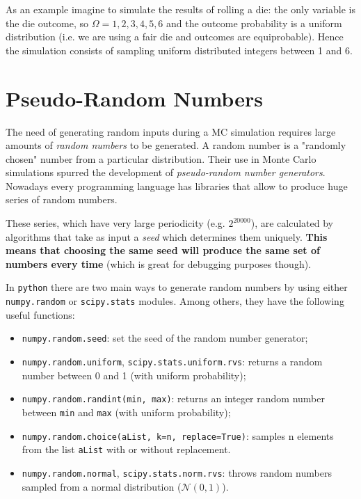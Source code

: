 As an example imagine to simulate the results of rolling a die: the only variable is the die outcome, so $\Omega =1,2,3,4,5,6$ and the outcome probability is a uniform distribution (i.e. we are using a fair die and outcomes are equiprobable). Hence the simulation consists of sampling uniform distributed integers between 1 and 6.

\section{Pseudo-Random Numbers}
\label{pseudo-random-numbers}

The need of generating random inputs during a MC simulation requires large amounts of \emph{random numbers} to be generated. A random number is a "randomly chosen" number from a particular distribution.
Their use in Monte Carlo simulations spurred the development of \emph{pseudo-random number generators}. Nowadays every programming language has libraries that allow to produce huge series of random numbers. 

These series, which have very large periodicity (e.g. $2^{20000}$), are calculated by algorithms that take as input a \emph{seed} which determines them uniquely. \textbf{This means that choosing the same seed will produce the same set of numbers every time} (which is great for debugging purposes though).

In \texttt{python} there are two main ways to generate random numbers by using either \texttt{numpy.random} or \texttt{scipy.stats} modules. Among others, they have the following useful functions:
\begin{itemize}
\tightlist
\item \texttt{numpy.random.seed}: set the seed of the random number generator;
\item \texttt{numpy.random.uniform}, \texttt{scipy.stats.uniform.rvs}: returns a random number between 0 and 1 (with uniform probability);
\item \texttt{numpy.random.randint(min,\ max)}: returns an integer random number between \texttt{min} and \texttt{max} (with uniform probability);
\item \texttt{numpy.random.choice(aList,\ k=n, replace=True)}: samples n elements from the list \texttt{aList} with or without replacement.
\item \texttt{numpy.random.normal}, \texttt{scipy.stats.norm.rvs}: throws random numbers sampled from a normal distribution ($\mathcal{N}(0, 1)$).
\end{itemize}


